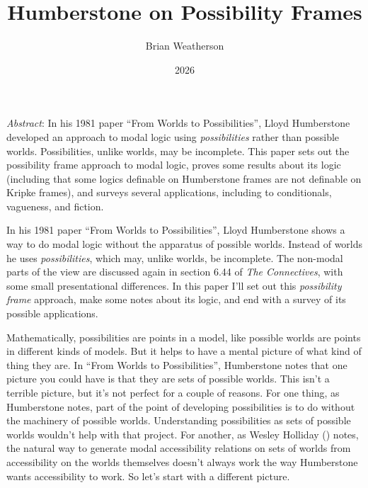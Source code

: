 \documentclass[
  11pt,
  letterpaper,
  DIV=11,
  numbers=noendperiod,
  twoside]{scrartcl}
\title{Humberstone on Possibility Frames}
\author{Brian Weatherson}
\date{2026}
\renewenvironment{abstract}
 {\vspace{-1.25cm}
 \quotation\small\noindent\emph{Abstract}:}
 {\endquotation}
\renewenvironment{abstract}
 {\quotation\small\noindent\emph{Abstract}:}
 {\endquotation\vspace{-0.02cm}}
\begin{document}
\maketitle
\begin{abstract}
In his 1981 paper ``From Worlds to Possibilities'', Lloyd Humberstone
developed an approach to modal logic using \emph{possibilities} rather
than possible worlds. Possibilities, unlike worlds, may be incomplete.
This paper sets out the possibility frame approach to modal logic,
proves some results about its logic (including that some logics
definable on Humberstone frames are not definable on Kripke frames), and
surveys several applications, including to conditionals, vagueness, and
fiction.
\end{abstract}


In his 1981 paper ``From Worlds to Possibilities'', Lloyd Humberstone
shows a way to do modal logic without the apparatus of possible worlds.
Instead of worlds he uses \emph{possibilities}, which may, unlike
worlds, be incomplete. The non-modal parts of the view are discussed
again in section 6.44 of \emph{The Connectives}, with some small
presentational differences. In this paper I'll set out this
\emph{possibility frame} approach, make some notes about its logic, and
end with a survey of its possible applications.

Mathematically, possibilities are points in a model, like possible
worlds are points in different kinds of models. But it helps to have a
mental picture of what kind of thing they are. In ``From Worlds to
Possibilities'', Humberstone notes that one picture you could have is
that they are sets of possible worlds. This isn't a terrible picture,
but it's not perfect for a couple of reasons. For one thing, as
Humberstone notes, part of the point of developing possibilities is to
do without the machinery of possible worlds. Understanding possibilities
as sets of possible worlds wouldn't help with that project. For another,
as Wesley Holliday () notes,
the natural way to generate modal accessibility relations on sets of
worlds from accessibility on the worlds themselves doesn't always work
the way Humberstone wants accessibility to work. So let's start with a
different picture.
\end{document}
